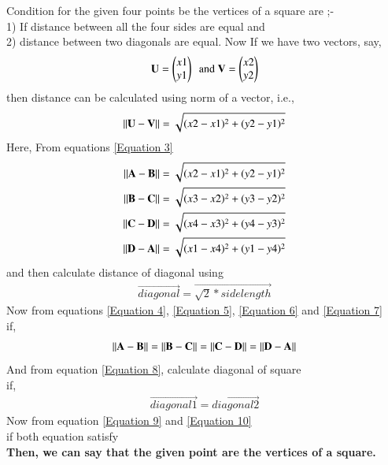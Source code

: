 \documentclass[journal,12pt,twocolumn]{IEEEtran}
\begin{document}
Condition for the given four points be the vertices of a square are ;-\\
1) If distance between all the four sides are equal and\\
2) distance between two diagonals are equal.
\vspace{0.2cm}
Now If we have two vectors, say,
\begin{align}
    \mathbf{U} = \begin{pmatrix}x1\\y1\end{pmatrix}\ ~\text{and}~
    \mathbf{V} = \begin{pmatrix}x2\\y2\end{pmatrix} 
\end{align}
then distance can be calculated using norm of a vector, i.e., 
\begin{align}
\label{Equation 3}
\lVert \mathbf{U} - \mathbf{V}\rVert = \mathbf{\sqrt{(x2-x1)^2+(y2-y1)^2}}
\end{align}
Here, From equations  
    \eqref{Equation 3}
\begin{align}
\label{Equation 4}
\lVert \mathbf{A} - \mathbf{B}\rVert =\mathbf{\sqrt{(x2-x1)^2+(y2-y1)^2}}\\
\label{Equation 5}
\lVert \mathbf{B} - \mathbf{C}\rVert =\mathbf{\sqrt{(x3-x2)^2+(y3-y2)^2}}\\
\label{Equation 6}
\lVert \mathbf{C} - \mathbf{D}\rVert =\mathbf{\sqrt{(x4-x3)^2+(y4-y3)^2}}\\
\label{Equation 7}
\lVert \mathbf{D} - \mathbf{A}\rVert =\mathbf{\sqrt{(x1-x4)^2+(y1-y4)^2}}
\end{align}
and then calculate distance of diagonal using 
\begin{align}
\label{Equation 8}
\vec{diagonal}=\vec{\sqrt{2}* side length}
\end{align}
Now from equations 
\eqref{Equation 4}, \eqref{Equation 5}, \eqref{Equation 6} and \eqref{Equation 7}\\
if,
\begin{align}
\label{Equation 9}
\lVert \mathbf{A} - \mathbf{B}\rVert=\lVert \mathbf{B} - \mathbf{C}\rVert=\lVert \mathbf{C} - \mathbf{D}\rVert=\lVert \mathbf{D} - \mathbf{A}\rVert
\end{align}
And from equation 
\eqref{Equation 8}, calculate diagonal of square\\
if,
\begin{align}
\label{Equation 10}
\vec{diagonal1} = \vec{diagonal2}
\end{align}
Now from equation 
\eqref{Equation 9} and \eqref{Equation 10}\\
if both equation satisfy\\
\textbf{Then, we can say that the given point are the vertices of a square.}
\\
\end{document}
